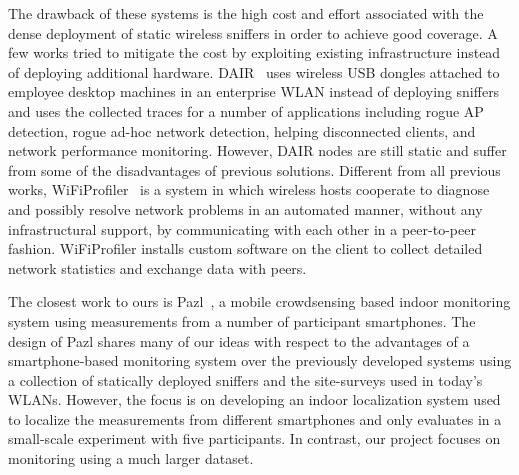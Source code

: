 The drawback of these systems is the high cost and effort associated with the
dense deployment of static wireless sniffers in order to achieve good
coverage. A few works tried to mitigate the cost by exploiting existing
infrastructure instead of deploying additional hardware.
DAIR~\cite{bahl:mobisys2006,chan:nsdi2006} uses wireless USB dongles attached
to employee desktop machines in an enterprise WLAN instead of deploying
sniffers and uses the collected traces for a number of applications including
rogue AP detection, rogue ad-hoc network detection, helping disconnected
clients, and network performance monitoring. However, DAIR nodes are still
static and suffer from some of the disadvantages of previous solutions.
Different from all previous works, WiFiProfiler~\cite{chandra:mobisys2006} is
a system in which wireless hosts cooperate to diagnose and possibly resolve
network problems in an automated manner, without any infrastructural support,
by communicating with each other in a peer-to-peer fashion. WiFiProfiler
installs custom software on the client to collect detailed network statistics
and exchange data with peers.

The closest work to ours is Pazl~\cite{radu:cnsm2013}, a mobile crowdsensing
based indoor \wifi{} monitoring system using measurements from a number of
participant smartphones. The design of Pazl shares many of our ideas with
respect to the advantages of a smartphone-based monitoring system over the
previously developed systems using a collection of statically deployed
sniffers and the site-surveys used in today's WLANs. However, the focus is on
developing an indoor localization system used to localize the measurements
from different smartphones and only evaluates in a small-scale experiment
with five participants. In contrast, our project focuses on \wifi{}
monitoring using a much larger dataset.
\fi

